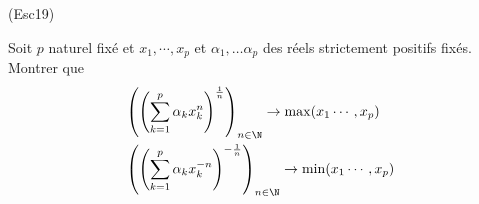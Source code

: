\begin{tiny}(Esc19)\end{tiny} Soit $p$ naturel fixé et $x_1,\cdots,x_p$ et $\alpha_1,\dots \alpha_p$ des réels strictement positifs fixés. Montrer que
\begin{align*}
 &\left( \left( \sum_{k=1}^p \alpha_k x_k^n\right)^{\frac{1}{n}} \right) _{n\in \N} \rightarrow 
\max(x_1\cdots,x_p)\\
&\left( \left( \sum_{k=1}^p \alpha_k x_k^{-n}\right)^{-\frac{1}{n}} \right) _{n\in \N} \rightarrow 
\min(x_1\cdots,x_p)
\end{align*}
 